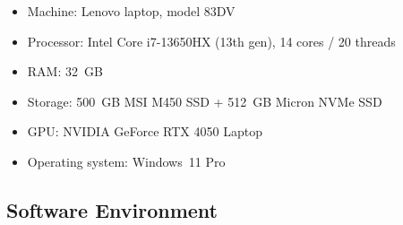 \documentclass[12pt, a4paper]{report}
\begin{document}
\begin{itemize}[noitemsep]
  \item Machine: Lenovo laptop, model 83DV
  \item Processor: Intel Core i7-13650HX (13th gen), 14 cores / 20 threads
  \item RAM: 32~GB
  \item Storage: 500~GB MSI M450 SSD + 512~GB Micron NVMe SSD
  \item GPU: NVIDIA GeForce RTX 4050 Laptop
  \item Operating system: Windows~11 Pro
\end{itemize}

\subsection{Software Environment}
\end{document}
